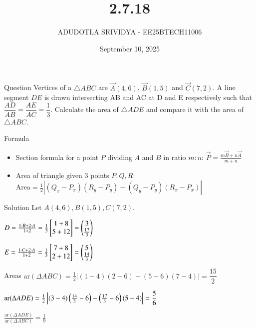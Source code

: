 \documentclass{beamer}
\title
{2.7.18}
\date{September 10, 2025}
\author 
{ADUDOTLA SRIVIDYA - EE25BTECH11006}
\begin{document}
\frame{\titlepage}

\begin{frame}{Question}
Vertices of a $\triangle ABC$ are $\vec{A}(4,6)$, $\vec{B}(1,5)$ and $\vec{C}(7,2)$.  
A line segment $DE$ is drawn intersecting AB and AC at D and E respectively such that  
$\dfrac{AD}{AB} = \dfrac{AE}{AC} = \dfrac{1}{3}$.  
Calculate the area of $\triangle ADE$ and compare it with the area of $\triangle ABC$.
\end{frame}

\begin{frame}{Formula}
\begin{itemize}
    \item Section formula for a point $P$ dividing $A$ and $B$ in ratio $m:n$:
    $
    \vec{P} = \frac{m\vec{B}+n\vec{A}}{m+n}
    $
    \item Area of triangle given 3 points $P,Q,R$:
    $
    \text{Area} = \frac{1}{2}\left| 
    (Q_x-P_x)(R_y-P_y) - (Q_y-P_y)(R_x-P_x)
    \right|
    $
\end{itemize}
\end{frame}

\begin{frame}{Solution}
Let $A(4,6), B(1,5), C(7,2)$.
\begin{center}
$
D = \frac{1\cdot B + 2\cdot A}{1+2}
= \frac{1}{3}\begin{bmatrix}1+8 \\ 5+12 \end{bmatrix}
= \begin{pmatrix}3\\\tfrac{17}{3}\end{pmatrix}
$ 

$
E = \frac{1\cdot C + 2\cdot A}{1+2}
= \frac{1}{3}\begin{bmatrix}7+8 \\ 2+12 \end{bmatrix}
= \begin{pmatrix}5\\\tfrac{14}{3}\end{pmatrix}
$
\end{center}
\end{frame}

\begin{frame}{Areas}
$
\text{ar}(\Delta ABC) = \tfrac{1}{2}\left|
(1-4)(2-6) - (5-6)(7-4) \right| = \dfrac{15}{2}
$

$
\text{ar}(\Delta ADE) = \tfrac{1}{2}\left|
(3-4)\left(\tfrac{14}{3}-6\right) - \left(\tfrac{17}{3}-6\right)(5-4) \right| = \dfrac{5}{6}
$
\begin{center}
$
\frac{\text{ar}(\Delta ADE)}{\text{ar}(\Delta ABC)} = \frac{1}{9}
$
\end{center}
\end{frame}
\end{document}
